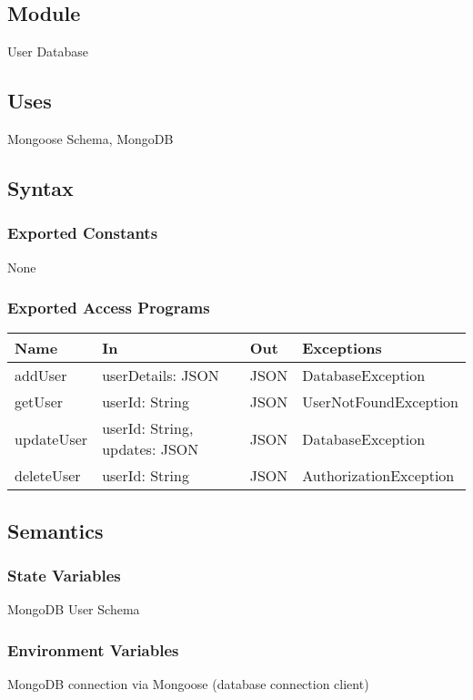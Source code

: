 \documentclass[12pt, titlepage]{article}
\begin{document}
\subsection{Module}
User Database

\subsection{Uses}
Mongoose Schema, MongoDB

\subsection{Syntax}

\subsubsection{Exported Constants}
None

\subsubsection{Exported Access Programs}

\begin{center}
\begin{tabular}{p{2cm} p{4cm} p{2cm} p{4cm}}
\hline
\textbf{Name} & \textbf{In} & \textbf{Out} & \textbf{Exceptions} \\
\hline
addUser & userDetails: JSON & JSON & DatabaseException \\
getUser & userId: String & JSON & UserNotFoundException \\
updateUser & userId: String, updates: JSON & JSON & DatabaseException \\
deleteUser & userId: String & JSON & AuthorizationException \\
\hline
\end{tabular}
\end{center}

\subsection{Semantics}

\subsubsection{State Variables}
MongoDB User Schema

\subsubsection{Environment Variables}
MongoDB connection via Mongoose (database connection client)
\end{document}
